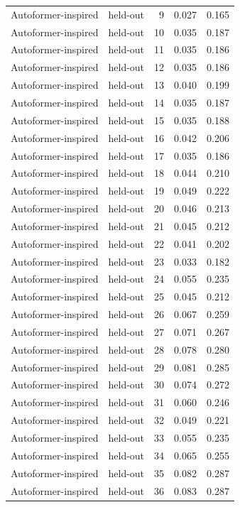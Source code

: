 \begin{tabular}{llrrr}
Autoformer-inspired & held-out & 9 & 0.027 & 0.165 \\
Autoformer-inspired & held-out & 10 & 0.035 & 0.187 \\
Autoformer-inspired & held-out & 11 & 0.035 & 0.186 \\
Autoformer-inspired & held-out & 12 & 0.035 & 0.186 \\
Autoformer-inspired & held-out & 13 & 0.040 & 0.199 \\
Autoformer-inspired & held-out & 14 & 0.035 & 0.187 \\
Autoformer-inspired & held-out & 15 & 0.035 & 0.188 \\
Autoformer-inspired & held-out & 16 & 0.042 & 0.206 \\
Autoformer-inspired & held-out & 17 & 0.035 & 0.186 \\
Autoformer-inspired & held-out & 18 & 0.044 & 0.210 \\
Autoformer-inspired & held-out & 19 & 0.049 & 0.222 \\
Autoformer-inspired & held-out & 20 & 0.046 & 0.213 \\
Autoformer-inspired & held-out & 21 & 0.045 & 0.212 \\
Autoformer-inspired & held-out & 22 & 0.041 & 0.202 \\
Autoformer-inspired & held-out & 23 & 0.033 & 0.182 \\
Autoformer-inspired & held-out & 24 & 0.055 & 0.235 \\
Autoformer-inspired & held-out & 25 & 0.045 & 0.212 \\
Autoformer-inspired & held-out & 26 & 0.067 & 0.259 \\
Autoformer-inspired & held-out & 27 & 0.071 & 0.267 \\
Autoformer-inspired & held-out & 28 & 0.078 & 0.280 \\
Autoformer-inspired & held-out & 29 & 0.081 & 0.285 \\
Autoformer-inspired & held-out & 30 & 0.074 & 0.272 \\
Autoformer-inspired & held-out & 31 & 0.060 & 0.246 \\
Autoformer-inspired & held-out & 32 & 0.049 & 0.221 \\
Autoformer-inspired & held-out & 33 & 0.055 & 0.235 \\
Autoformer-inspired & held-out & 34 & 0.065 & 0.255 \\
Autoformer-inspired & held-out & 35 & 0.082 & 0.287 \\
Autoformer-inspired & held-out & 36 & 0.083 & 0.287 \\

\end{tabular}
